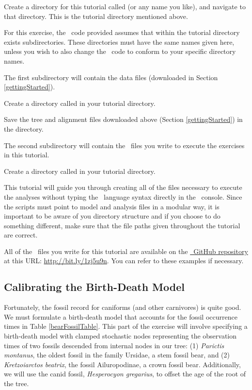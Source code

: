 \begin{framed}
Create a directory for this tutorial called {\textcolor{red}{}} (or any name you like), and navigate to that directory. This is the tutorial directory mentioned above.
\end{framed}

For this exercise, the \Rev~code provided assumes that within the tutorial directory exists  subdirectories. 
These directories must have the same names given here, unless you wish to also change the \Rev~code to conform to your specific directory names.

The first subdirectory will contain the data files (downloaded in Section \ref{gettingStarted}).
\begin{framed}
Create a directory called {\textcolor{red}{}} in your tutorial directory. 

Save the tree and alignment files downloaded above (Section \ref{gettingStarted}) in the  directory.
\end{framed}

The second subdirectory will contain the \Rev~files you write to execute the exercises in this tutorial. 
\begin{framed}
Create a directory called {\textcolor{red}{}} in your tutorial directory. 
\end{framed}
This tutorial will guide you through creating all of the files necessary to execute the analyses without typing the \Rev~language syntax directly in the \RevBayes~console. 
Since the scripts must point to model and analysis files in a modular way, it is important to be aware of you directory structure and if you choose to do something different, make sure that the file paths given throughout the tutorial are correct.

All of the \Rev~files you write for this tutorial are available on the \href{https://github.com/revbayes/revbayes}{\RevBayes~GitHub repository} at this URL: \href{http://bit.ly/1zj5u9n}{http://bit.ly/1zj5u9n}.
You can refer to these examples if necessary.

\bigskip
\subsection{Calibrating the Birth-Death Model}\label{brMods} 

Fortunately, the fossil record for caniforms (and other carnivores) is quite good. 
We must formulate a birth-death model that accounts for the fossil occurrence times in Table \ref{bearFossilTable}. 
This part of the exercise will involve specifying a birth-death model with clamped stochastic nodes representing the observation times of two fossils descended from internal nodes in our tree: (1) \textit{Parictis montanus}, the oldest fossil in the family Ursidae, a stem fossil bear, and (2) \textit{Kretzoiarctos beatrix}, the fossil Ailuropodinae, a crown fossil bear.
Additionally, we will use the canid fossil, \textit{Hesperocyon gregarius}, to offset the age of the root of the tree. 

